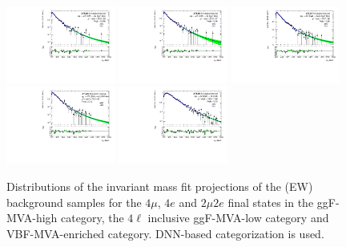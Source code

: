 \begin{figure}[htbp]
    \centering
    \includegraphics[width=0.32\textwidth]{figures/HMHZZ/background/dnn/bkg_shape_qqZZEW_ggF_4mu_180_to_2200_log.pdf}
    \includegraphics[width=0.32\textwidth]{figures/HMHZZ/background/dnn/bkg_shape_qqZZEW_ggF_4e_180_to_2200_log.pdf}
    \includegraphics[width=0.32\textwidth]{figures/HMHZZ/background/dnn/bkg_shape_qqZZEW_ggF_2mu2e_180_to_2200_log.pdf} \\
    \includegraphics[width=0.32\textwidth]{figures/HMHZZ/background/dnn/bkg_shape_qqZZEW_VBF_incl_180_to_2200_log.pdf}
    \includegraphics[width=0.32\textwidth]{figures/HMHZZ/background/dnn/bkg_shape_qqZZEW_rest_180_to_2200_log.pdf}
    \caption{Distributions of the \mfl invariant mass fit projections of the \qqZZ (EW) background samples for the
    $4\mu$, $4e$ and $2\mu 2e$ final states in the ggF-MVA-high category, the $4\ell$ inclusive ggF-MVA-low category and VBF-MVA-enriched category.
    DNN-based categorization is used.} 
    \label{fig:qqZZEW_m4l_shape_all_DNN}
\end{figure}

